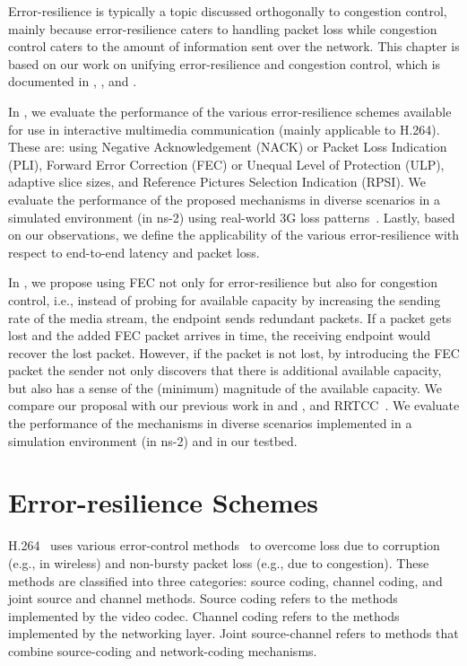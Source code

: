 Error-resilience is typically a topic discussed orthogonally to congestion
control, mainly because error-resilience caters to handling
packet loss while congestion control caters to the amount of information sent
over the network. This chapter is based on our work on unifying
error-resilience and congestion control, which is documented in 
, , and \cite{draft.adaptive.fec}.

In , we evaluate the performance of the various
error-resilience schemes available for use in interactive multimedia
communication (mainly applicable to H.264). These are: using Negative
Acknowledgement (NACK) or Packet Loss Indication (PLI), Forward Error
Correction (FEC) or Unequal Level of Protection (ULP), adaptive slice sizes,
and Reference Pictures Selection Indication (RPSI). We evaluate the
performance of the proposed mechanisms in diverse scenarios in a simulated
environment (in ns-2) using real-world 3G loss patterns~\cite{3gppSim}.
Lastly, based on our observations, we define the applicability of the various
error-resilience with respect to end-to-end latency and packet loss.

In , we propose using FEC not only for error-resilience but
also for congestion control, i.e., instead of probing for available capacity
by increasing the sending rate of the media stream, the endpoint sends
redundant packets. If a packet gets lost and the added FEC packet arrives in
time, the receiving endpoint would recover the lost packet. However, if the
packet is not lost, by introducing the FEC packet the sender not only
discovers that there is additional available capacity, but also has a sense of
the (minimum) magnitude of the available capacity. We compare our proposal
with our previous work in  and , and 
RRTCC~\cite{draft.rrtcc}. We evaluate the performance of the
mechanisms in diverse scenarios implemented in a simulation environment (in
ns-2) and in our testbed.

\section{Error-resilience Schemes}

H.264~\cite{h264} uses various error-control methods~\cite{err_res_h264_std,
wang98error, wang00review, 310669} to overcome loss due to corruption (e.g.,
in wireless) and non-bursty packet loss (e.g., due to congestion). These
methods are classified into three categories: source coding, channel coding,
and joint source and channel methods. Source coding refers to the methods
implemented by the video codec. Channel coding refers to the methods
implemented by the networking layer. Joint source-channel refers to methods
that combine source-coding and network-coding mechanisms.

